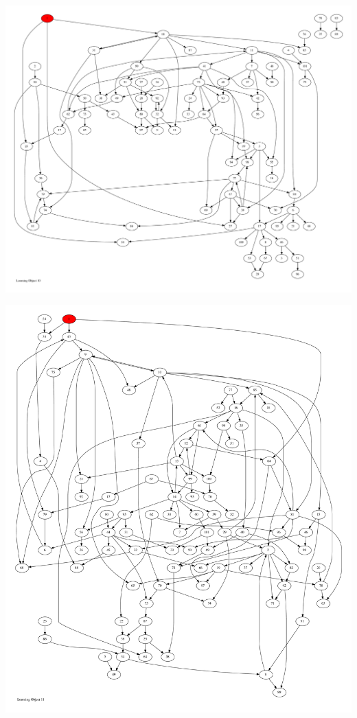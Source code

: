\documentclass{article}
\begin{document}
\newpage
\includegraphics[max height=\textheight,max width=\textwidth]{looming_object/loom_obj10_pp.pdf}

\newpage
\includegraphics[max height=\textheight,max width=\textwidth]{looming_object/loom_obj11_pp.pdf}
\end{document}
